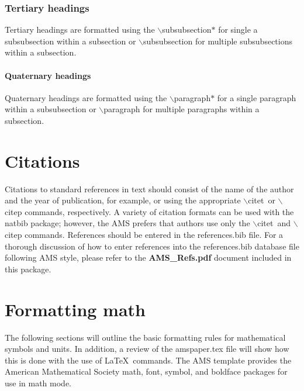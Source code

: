 \documentclass{ametsoc}
\begin{document}
\subsubsection*{Tertiary headings} 
Tertiary headings are formatted using the
$\backslash$subsubsection$*${\tt\string{\string}} for single a subsubsection
within a subsection or
$\backslash$subsubsection{\tt\string{\string}} 
for multiple subsubsections
within a subsection. 

\paragraph*{Quaternary headings} 
Quaternary headings are formatted using the
$\backslash$paragraph$*${\tt\string{\string}} for a single paragraph within
a subsubsection or
$\backslash$paragraph{\tt\string{\string}} 
for multiple paragraphs
within a subsection.

\section{Citations}
Citations to standard references in text should consist of the name of the
author and the year of publication, for example, \citet{Becker+Schmitz2003} or
\citep{Becker+Schmitz2003} using the appropriate $\backslash$citet\ or
$\backslash$citep commands, respectively. A variety of citation formats can
be used with the natbib package; however, the AMS prefers that authors use only the $\backslash$citet\ and
$\backslash$citep commands. References should be entered in the references.bib file. For a thorough
discussion of how to enter references into the references.bib database file
following AMS style, please refer to the \textbf{AMS\_Refs.pdf} document
included in this package.

\section{Formatting math}
The following sections will outline the basic formatting rules for
mathematical symbols and units.  In addition, a review of the amspaper.tex
file will show how this is done with the use of \LaTeX\ commands.  The AMS
template provides the American Mathematical Society math, font, symbol, and
boldface packages for use in math mode.
\end{document}
